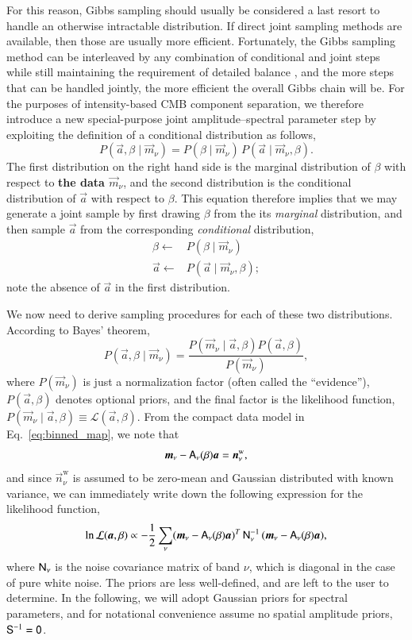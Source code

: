 \documentclass[twocolumn]{aa}
\newcommand{\A}[0]{\tens{A}}
\newcommand{\n}[0]{\vec{n}}
\renewcommand{\a}[0]{\vec{a}}
\newcommand{\m}[0]{\vec{m}}
\newcommand{\N}[0]{\tens{N}}
\newcommand{\iN}[0]{\tens{N}^{-1}}
\renewcommand{\S}[0]{\tens{S}}
\begin{document}
For this reason, Gibbs sampling should usually be considered a last
resort to handle an otherwise intractable distribution. If direct
joint sampling methods are available, then those are usually more
efficient. Fortunately, the Gibbs sampling method can be interleaved
by any combination of conditional and joint steps while still
maintaining the requirement of detailed balance \citep{geman:1984},
and the more steps that can be handled jointly, the more efficient the
overall Gibbs chain will be. For the purposes of intensity-based CMB
component separation, we therefore introduce a new special-purpose
joint amplitude--spectral parameter step by exploiting the definition
of a conditional distribution as follows, 
\begin{equation}
  P(\a,\beta\mid\m_\nu) = P(\beta\mid\m_\nu)\, P(\a\mid\m_\nu,\beta).
  \label{eq:joint_P_to_marg_cond}
\end{equation}
The first distribution on the right hand side is the marginal
distribution of $\beta$ with respect to \textbf{the data $\m_\nu$}, and the second
distribution is the conditional distribution of $\a$ with respect to
$\beta$. This equation therefore implies that we may generate a joint
sample by first drawing $\beta$ from the its \emph{marginal}
distribution, and then sample $\a$ from the corresponding
\emph{conditional} distribution,
\begin{align*}
 \beta \leftarrow & P(\beta\mid\m_{\nu})\\\label{eq:beta_marg} 
 \a\leftarrow & P(\a\mid\m_{\nu},\beta);
\end{align*}
note the absence of $\a$ in the first distribution.

We now need to derive sampling procedures for each of these two
distributions. According to Bayes' theorem,
\begin{equation}
 P(\a,\beta\mid\m_{\nu}) = \frac{P(\m_{\nu}\mid\a,\beta) P(\a,\beta)}{P(\m_{\nu})}, \label{eq:joint_P_Bayes}
\end{equation}
where $P(\m_{\nu})$ is just a normalization factor (often called the
``evidence''), $P(\a,\beta)$ denotes optional priors, and the final
factor is the likelihood function, $P(\m_{\nu}\mid\a,\beta) \equiv
\mathcal{L}(\a,\beta)$. From the compact data model in
Eq.~\eqref{eq:binned_map}, we note that
\begin{equation}
  \m_{\nu} - \A_{\nu}(\beta)\a = \n^{\mathrm{w}}_{\nu},
  \label{eq:map_residual}
\end{equation}
and since $\n^{\mathrm{w}}_{\nu}$ is assumed to be zero-mean and
Gaussian distributed with known variance, we can immediately write
down the following expression for the likelihood function,
\begin{equation}
  \ln\mathcal{L}(\a,\beta) \propto -\frac{1}{2}\sum_{\nu}(\m_\nu-\A_\nu(\beta) \a)^T\, \iN_\nu\, (\m_\nu-\A_\nu(\beta) \a),
  \label{eq:likelihood_full}  
\end{equation}
where $\N_\nu$ is the noise covariance matrix of band $\nu$, 
which is diagonal in the case of pure white noise.
The priors are less well-defined, and are left to the user to determine. In
the following, we will adopt Gaussian priors for spectral parameters,
and for notational convenience assume no spatial amplitude priors, $\S^{-1}=\tens 0$.
\end{document}
